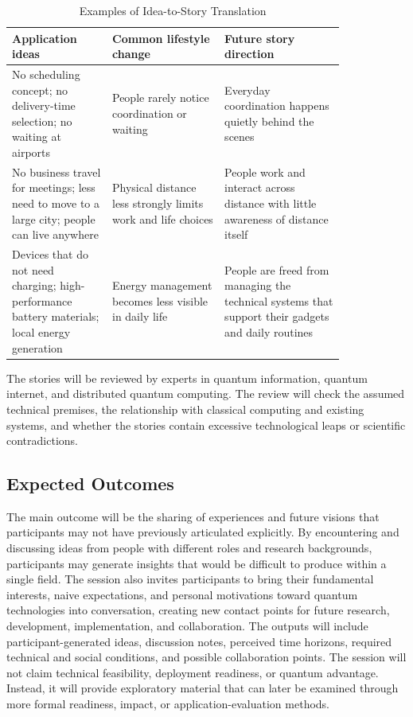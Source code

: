 \documentclass[10pt,conference]{IEEEtran}
\begin{document}
\begin{table}[t]
\caption{Examples of Idea-to-Story Translation}
\label{tab:stories}
\centering
\scriptsize
\setlength{\tabcolsep}{2pt}
\begin{tabular}{p{0.25\linewidth}p{0.28\linewidth}p{0.30\linewidth}}
\hline
Application ideas & Common lifestyle change & Future story direction \\
\hline
No scheduling concept; no delivery-time selection; no waiting at airports & People rarely notice coordination or waiting & Everyday coordination happens quietly behind the scenes \\
No business travel for meetings; less need to move to a large city; people can live anywhere & Physical distance less strongly limits work and life choices & People work and interact across distance with little awareness of distance itself \\
Devices that do not need charging; high-performance battery materials; local energy generation & Energy management becomes less visible in daily life & People are freed from managing the technical systems that support their gadgets and daily routines \\
\hline
\end{tabular}
\end{table}

The stories will be reviewed by experts in quantum information, quantum internet, and distributed quantum computing. The review will check the assumed technical premises, the relationship with classical computing and existing systems, and whether the stories contain excessive technological leaps or scientific contradictions.

\subsection*{Expected Outcomes}

The main outcome will be the sharing of experiences and future visions that participants may not have previously articulated explicitly. By encountering and discussing ideas from people with different roles and research backgrounds, participants may generate insights that would be difficult to produce within a single field. The session also invites participants to bring their fundamental interests, naive expectations, and personal motivations toward quantum technologies into conversation, creating new contact points for future research, development, implementation, and collaboration. The outputs will include participant-generated ideas, discussion notes, perceived time horizons, required technical and social conditions, and possible collaboration points. The session will not claim technical feasibility, deployment readiness, or quantum advantage. Instead, it will provide exploratory material that can later be examined through more formal readiness, impact, or application-evaluation methods.
\end{document}

